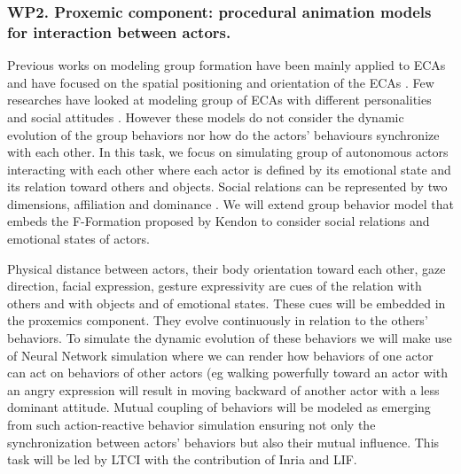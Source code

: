 

\subsubsection{WP2. Proxemic component: procedural animation models for interaction between actors.}

Previous works on modeling group formation have been mainly applied to ECAs and have focused on the spatial positioning and orientation of the ECAs \cite{Pedica2010}. Few researches have looked at modeling group of ECAs with different personalities and social attitudes \cite{Gillies2004,Prada2005}. However these models do not consider the dynamic evolution of the group behaviors nor how do the actors' behaviours synchronize with each other. In this task, we focus on simulating group of autonomous actors interacting with each other where each actor is defined by its emotional state and its relation toward others and objects. Social relations can be represented by two dimensions, affiliation and dominance \cite{Wiggins1979}. We will extend group behavior model \cite{Pedica2010} that embeds the F-Formation proposed by Kendon \cite{Kendon2004} to consider social relations and emotional states of actors. 

Physical distance between actors, their body orientation toward each other, gaze direction, facial expression, gesture expressivity are cues of the relation with others and with objects and of emotional states. These cues will be embedded in the proxemics component. They evolve continuously in relation to the others' behaviors. To simulate the dynamic evolution of these behaviors we will make use of Neural Network simulation \cite{Prepin2013} where we can render how behaviors of one actor can act on behaviors of other actors (eg walking powerfully toward an actor with an angry expression will result in moving backward of another actor with a less dominant attitude. Mutual coupling of behaviors will be modeled as emerging from such action-reactive behavior simulation \cite{Prepin2013} ensuring not only the synchronization between actors' behaviors but also their mutual influence. This task will be led by LTCI with the contribution of Inria and LIF.


\endinput